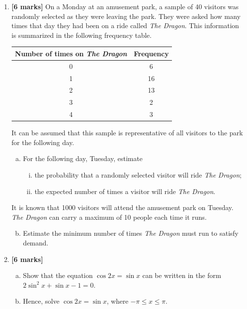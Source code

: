 \documentclass[12pt, twoside]{article}
\begin{document}
\begin{enumerate}
\vspace{1cm}

\item \textbf{[6 marks]} On a Monday at an amusement park, a sample of 40 visitors was randomly selected as they were leaving the park. They were asked how many times that day they had been on a ride called \textit{The Dragon}. This information is summarized in the following frequency table.

\begin{center}
\begin{tabular}{|c|c|}
\hline
\textbf{Number of times on \textit{The Dragon}} & \textbf{Frequency} \\
\hline
0 & 6 \\
1 & 16 \\
2 & 13 \\
3 & 2 \\
4 & 3 \\
\hline
\end{tabular}
\end{center}

It can be assumed that this sample is representative of all visitors to the park for the following day.

    \begin{enumerate}[(a)]
        \item For the following day, Tuesday, estimate
        \begin{enumerate}[(i)]
            \item the probability that a randomly selected visitor will ride \textit{The Dragon};
            \item the expected number of times a visitor will ride \textit{The Dragon}.
        \end{enumerate}
    \end{enumerate}
    
    It is known that 1000 visitors will attend the amusement park on Tuesday. \textit{The Dragon} can carry a maximum of 10 people each time it runs.
    
    \begin{enumerate}[(a)]
        \setcounter{enumii}{1}
        \item Estimate the minimum number of times \textit{The Dragon} must run to satisfy demand.
    \end{enumerate}

\vspace{1cm}

\item \textbf{[6 marks]}
    \begin{enumerate}[(a)]
        \item Show that the equation $\cos 2x = \sin x$ can be written in the form $2\sin^2 x + \sin x - 1 = 0$.
        \item Hence, solve $\cos 2x = \sin x$, where $-\pi \leq x \leq \pi$.
    \end{enumerate}


\end{enumerate}
\end{document}
